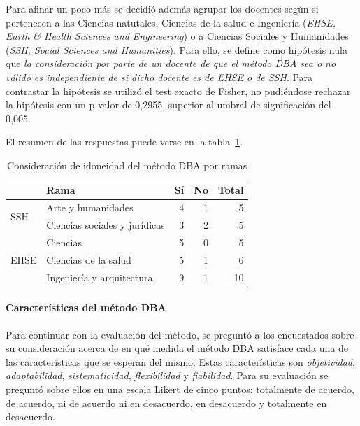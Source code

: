 Para afinar un poco más se decidió además agrupar los docentes según si pertenecen a las Ciencias natutales, Ciencias de la salud e Ingeniería (\emph{EHSE, Earth \& Health Sciences and Engineering}) o a Ciencias Sociales y Humanidades (\emph{SSH, Social Sciences and Humanities}). Para ello, se define como hipótesis nula que \emph{la consideración por parte de un docente de que el método DBA sea o no válido es independiente de si  dicho docente es de EHSE o de SSH}. Para contrastar la hipótesis se utilizó el test exacto de Fisher, no pudiéndose rechazar la hipótesis con un p-valor de 0,2955, superior al umbral de significación del 0,005.

El resumen de las respuestas puede verse en la tabla~\ref{tab:cap:encuesta:metodoDBA:rama}.

\begin{table}
  \begin{center}
  \begin{tabular}{| l | l | r | r | r |}
    \hline
    & Rama & Sí & No & Total \\
    \hline
    \hline
    \multirow{2}{2.5cm}{SSH} & Arte y humanidades & 4 & 1 & 5  \\
    \cline{2-5}
    & Ciencias sociales y jurídicas & 3 & 2 & 5  \\
    \hline
    \multirow{3}{2.5cm}{EHSE} & Ciencias & 5 & 0 & 5  \\
    \cline{2-5}
    & Ciencias de la salud & 5 & 1 & 6  \\
    \cline{2-5}
    & Ingeniería y arquitectura & 9 & 1 & 10 \\
    \hline
  \end{tabular}
\end{center}
\caption{Consideración de idoneidad del método DBA por ramas}
\label{tab:cap:encuesta:metodoDBA:rama}
\end{table}

\paragraph{Características del método DBA}

Para continuar con la evaluación del método, se preguntó a los encuestados sobre su consideración acerca de en qué medida el método DBA satisface cada una de las características que se esperan del mismo. Estas características son \emph{objetividad}, \emph{adaptabilidad}, \emph{sistematicidad}, \emph{flexibilidad} y \emph{fiabilidad}. Para su evaluación se preguntó sobre ellos en una escala Likert de cinco puntos: totalmente de acuerdo, de acuerdo, ni de acuerdo ni en desacuerdo, en desacuerdo y totalmente en desacuerdo. 

